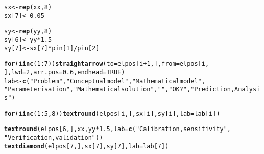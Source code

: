 \documentclass{article}\usepackage[]{graphicx}\usepackage[]{color}
\makeatletter
\newcommand{\hlnum}[1]{\textcolor[rgb]{0.686,0.059,0.569}{#1}}%
\newcommand{\hlstr}[1]{\textcolor[rgb]{0.192,0.494,0.8}{#1}}%
\newcommand{\hlopt}[1]{\textcolor[rgb]{0,0,0}{#1}}%
\newcommand{\hlstd}[1]{\textcolor[rgb]{0.345,0.345,0.345}{#1}}%
\newcommand{\hlkwa}[1]{\textcolor[rgb]{0.161,0.373,0.58}{\textbf{#1}}}%
\newcommand{\hlkwb}[1]{\textcolor[rgb]{0.69,0.353,0.396}{#1}}%
\newcommand{\hlkwc}[1]{\textcolor[rgb]{0.333,0.667,0.333}{#1}}%
\newcommand{\hlkwd}[1]{\textcolor[rgb]{0.737,0.353,0.396}{\textbf{#1}}}%
\newenvironment{kframe}{%
 \def\at@end@of@kframe{}%
 \ifinner\ifhmode%
  \def\at@end@of@kframe{\end{minipage}}%
  \begin{minipage}{\columnwidth}%
 \fi\fi%
 \def\FrameCommand##1{\hskip\@totalleftmargin \hskip-\fboxsep
 \colorbox{shadecolor}{##1}\hskip-\fboxsep
     \hskip-\linewidth \hskip-\@totalleftmargin \hskip\columnwidth}%
 \MakeFramed {\advance\hsize-\width
   \@totalleftmargin\z@ \linewidth\hsize
   \@setminipage}}%
 {\par\unskip\endMakeFramed%
 \at@end@of@kframe}
\newenvironment{knitrout}{}{} %
\makeatother
\begin{document}
\begin{knitrout}
\begin{kframe}
\begin{alltt}
\hlstd{sx} \hlkwb{<-} \hlkwd{rep}\hlstd{(xx,} \hlnum{8}\hlstd{)}
\hlstd{sx[}\hlnum{7}\hlstd{]} \hlkwb{<-} \hlnum{0.05}

\hlstd{sy} \hlkwb{<-} \hlkwd{rep}\hlstd{(yy,} \hlnum{8}\hlstd{)}
\hlstd{sy[}\hlnum{6}\hlstd{]} \hlkwb{<-} \hlstd{yy} \hlopt{*} \hlnum{1.5}
\hlstd{sy[}\hlnum{7}\hlstd{]} \hlkwb{<-} \hlstd{sx[}\hlnum{7}\hlstd{]} \hlopt{*} \hlstd{pin[}\hlnum{1}\hlstd{]}\hlopt{/}\hlstd{pin[}\hlnum{2}\hlstd{]}

\hlkwa{for} \hlstd{(i} \hlkwa{in} \hlkwd{c}\hlstd{(}\hlnum{1}\hlopt{:}\hlnum{7}\hlstd{))} \hlkwd{straightarrow}\hlstd{(}\hlkwc{to} \hlstd{= elpos[i} \hlopt{+} \hlnum{1}\hlstd{, ],} \hlkwc{from} \hlstd{= elpos[i,}
    \hlstd{],} \hlkwc{lwd} \hlstd{=} \hlnum{2}\hlstd{,} \hlkwc{arr.pos} \hlstd{=} \hlnum{0.6}\hlstd{,} \hlkwc{endhead} \hlstd{=} \hlnum{TRUE}\hlstd{)}
\hlstd{lab} \hlkwb{<-} \hlkwd{c}\hlstd{(}\hlstr{"Problem"}\hlstd{,} \hlstr{"Conceptual model"}\hlstd{,} \hlstr{"Mathematical model"}\hlstd{,}
    \hlstr{"Parameterisation"}\hlstd{,} \hlstr{"Mathematical solution"}\hlstd{,} \hlstr{""}\hlstd{,} \hlstr{"OK?"}\hlstd{,} \hlstr{"Prediction, Analysis"}\hlstd{)}

\hlkwa{for} \hlstd{(i} \hlkwa{in} \hlkwd{c}\hlstd{(}\hlnum{1}\hlopt{:}\hlnum{5}\hlstd{,} \hlnum{8}\hlstd{))} \hlkwd{textround}\hlstd{(elpos[i, ], sx[i], sy[i],} \hlkwc{lab} \hlstd{= lab[i])}

\hlkwd{textround}\hlstd{(elpos[}\hlnum{6}\hlstd{, ], xx, yy} \hlopt{*} \hlnum{1.5}\hlstd{,} \hlkwc{lab} \hlstd{=} \hlkwd{c}\hlstd{(}\hlstr{"Calibration,sensitivity"}\hlstd{,}
    \hlstr{"Verification,validation"}\hlstd{))}
\hlkwd{textdiamond}\hlstd{(elpos[}\hlnum{7}\hlstd{, ], sx[}\hlnum{7}\hlstd{], sy[}\hlnum{7}\hlstd{],} \hlkwc{lab} \hlstd{= lab[}\hlnum{7}\hlstd{])}


\end{alltt}
\end{kframe}
\end{knitrout}
\end{document}
